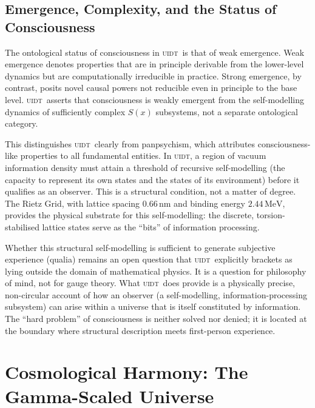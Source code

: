 \documentclass[12pt,a4paper,twoside]{article}
\theoremstyle{plain}
\theoremstyle{definition}
\theoremstyle{remark}
\newcommand{\UIDT}{\textsc{uidt}}
\newcommand{\MeV}{\,\mathrm{MeV}}
\newcommand{\ETorsion}{2.44\MeV}                    %
\newcommand{\LambdaGrid}{0.66\,\mathrm{nm}}         %
\begin{document}
\newpage
\subsection{Emergence, Complexity, and the Status of Consciousness}
\label{subsec:emergence-consciousness}

The ontological status of consciousness in \UIDT\ is that of weak emergence.
Weak emergence denotes properties that are in principle derivable from the
lower-level dynamics but are computationally irreducible in practice. Strong
emergence, by contrast, posits novel causal powers not reducible even in
principle to the base level. \UIDT\ asserts that consciousness is weakly
emergent from the self-modelling dynamics of sufficiently complex $S(x)$
subsystems, not a separate ontological category.

This distinguishes \UIDT\ clearly from panpsychism, which attributes
consciousness-like properties to all fundamental entities. In \UIDT, a region
of vacuum information density must attain a threshold of recursive
self-modelling (the capacity to represent its own states and the states of its
environment) before it qualifies as an observer. This is a structural
condition, not a matter of degree. The Rietz Grid, with lattice spacing
$\LambdaGrid$ and binding energy $\ETorsion$, provides the physical substrate
for this self-modelling: the discrete, torsion-stabilised lattice states serve
as the ``bits'' of information processing.

Whether this structural self-modelling is sufficient to generate subjective
experience (qualia) remains an open question that \UIDT\ explicitly brackets as
lying outside the domain of mathematical physics. It is a question for
philosophy of mind, not for gauge theory. What \UIDT\ does provide is a
physically precise, non-circular account of how an observer (a self-modelling,
information-processing subsystem) can arise within a universe that is itself
constituted by information. The ``hard problem'' of consciousness is neither
solved nor denied; it is located at the boundary where structural description
meets first-person experience.

\newpage

\section{Cosmological Harmony: The Gamma-Scaled Universe}
\label{sec:cosmology}
\end{document}
